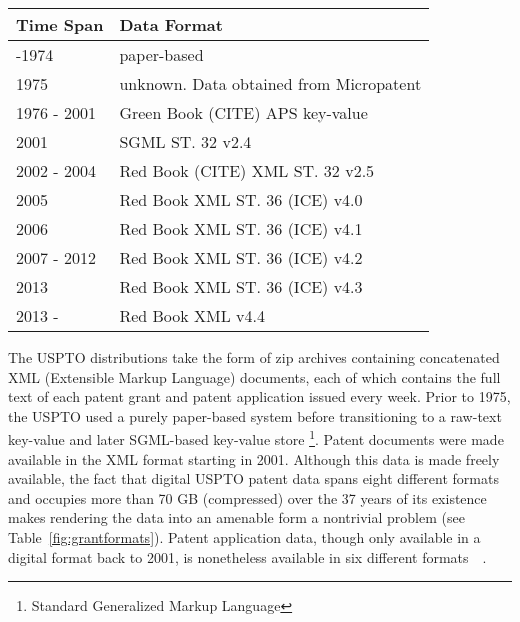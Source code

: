 \begin{table*}[t]
\center
\begin{tabular}{| l | l |}
\hline
Time Span & Data Format \\
\hline
-1974 & paper-based \\
1975 & unknown. Data obtained from Micropatent \\
1976 - 2001 & Green Book (CITE) APS key-value \\
2001 & SGML ST. 32 v2.4 \\
2002 - 2004 & Red Book (CITE) XML ST. 32 v2.5 \\
2005 & Red Book XML ST. 36 (ICE) v4.0 \\
2006 & Red Book XML ST. 36 (ICE) v4.1 \\ 
2007 - 2012 & Red Book XML ST. 36 (ICE) v4.2 \\
2013 & Red Book XML ST. 36 (ICE) v4.3 \\
2013 - & Red Book XML v4.4 \\
\hline
\end{tabular}
\caption{Table of USPTO grant data formats}
\label{fig:grantformats}
\end{table*}

The USPTO distributions take the form of zip archives containing concatenated XML (Extensible Markup Language) documents, each of which contains the full text of each patent grant and patent application issued every week. Prior to 1975, the USPTO used a purely paper-based system before transitioning to a raw-text key-value and later SGML-based key-value store \footnote{Standard Generalized Markup Language}. Patent documents were made available in the XML format starting in 2001. Although this data is made freely available, the fact that digital USPTO patent data spans eight different formats and occupies more than 70 GB (compressed) over the 37 years of its existence makes rendering the data into an amenable form a nontrivial problem (see Table~\ref{fig:grantformats}). Patent application data, though only available in a digital format back to 2001, is nonetheless available in six different formats~\cite{xmlresources}~\cite{xmlretrospective}.